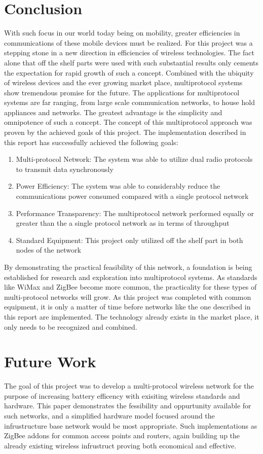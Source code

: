 \documentclass[conference]{IEEEtran}
\begin{document}
\section{Conclusion}
With such focus in our world today being on mobility, greater efficiencies in communications of these mobile devices must be realized.  For this project was a stepping stone in a new direction in efficiencies of wireless technologies.  The fact alone that off the shelf parts were used with such substantial results only cements the expectation for rapid growth of such a concept.  Combined with the ubiquity of wireless devices and the ever growing market place, multiprotocol systems show tremendous promise for the future.  The applications for multiprotocol systems are far ranging, from large scale communication networks, to house hold appliances and networks.  The greatest advantage is the simplicity and omnipotence of such a concept.  The concept of this multiprotocol approach was proven by the achieved goals of this project. 
The implementation described in this report has successfully achieved the following goals:
\begin{enumerate}
  \item Multi-protocol Network:  The system was able to utilize dual radio protocols to transmit data synchronously
  \item Power Efficiency: The system was able to considerably reduce the communications power consumed compared with a single protocol network
  \item Performance Transparency:   The multiprotocol network performed equally or greater than the a single protocol network as  in terms of throughput
  \item Standard Equipment:  This project only utilized off the shelf part in both nodes of the network
\end{enumerate}

By demonstrating the practical feasibility of this network, a foundation is being established for research and exploration into multiprotocol systems. As standards like WiMax and ZigBee become more common, the practicality for these types of multi-protocol networks will grow. As this project was completed with common equipment, it is only a matter of time before networks like the one described in this report are implemented.  The technology already exists in the market place, it only needs to be recognized and combined.

\section{Future Work}
The goal of this project was to develop a multi-protocol wireless network for the purpose of increasing battery efficency with exisiting wireless standards and hardware.  This paper demonstrates the fessibility and oppurtunity available for such networks, and a simplified hardware model focused around the infrustructure base network would be most appropriate.  Such implementations as ZigBee addons for common access points and routers, again building up the already existing wireless infrustruct proving both economical and effective. 



\end{document}

